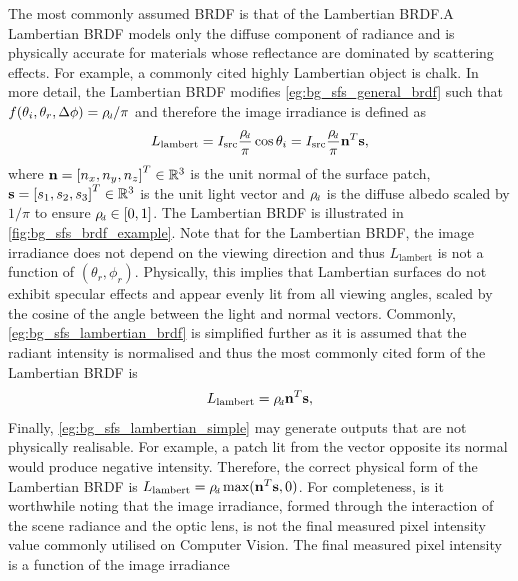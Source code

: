 The most commonly assumed BRDF is that of the Lambertian BRDF.\@ A Lambertian
BRDF models only the diffuse component of radiance and is physically accurate
for materials whose reflectance are dominated by scattering effects. For
example, a commonly cited highly Lambertian object is chalk. In more
detail, the Lambertian BRDF modifies \cref{eg:bg_sfs_general_brdf} such that
$f(\theta_i,\theta_r, \Delta \phi) = \rho_{\smallsub{d}} / \pi$ and therefore
the image irradiance is defined as
\begin{equation}\label{eg:bg_sfs_lambertian_brdf}
	L_{\operatorname{lambert}} = I_{\operatorname{src}} \frac{\rho_{\smallsub{d}}}{\pi} \cos{\theta_i} =
	I_{\operatorname{src}} \frac{\rho_{\smallsub{d}}}{\pi} \bb{n}^T \bb{s},
\end{equation}
where $\boldsymbol{\mathbf{n}} = {[n_x, n_y, n_z]}^T \in \mathbb{R}^{3}$ is the unit normal of the surface patch,
$\boldsymbol{\mathbf{s}} = {[s_1, s_2, s_3]}^T \in \mathbb{R}^{3}$ is the unit
light vector and $\rho_{\smallsub{d}}$ is the diffuse albedo scaled by $1/\pi$
to ensure $\rho_{\smallsub{d}} \in [0, 1]$. The Lambertian BRDF is illustrated
in \cref{fig:bg_sfs_brdf_example}. Note that for the Lambertian BRDF, the image
irradiance does not depend on the viewing direction and thus
$L_{\operatorname{lambert}}$ is not a function of $(\theta_r,\phi_r)$.
Physically, this implies that Lambertian surfaces do not exhibit specular
effects and appear evenly lit from all viewing angles, scaled by the cosine
of the angle between the light and normal vectors. Commonly,
\cref{eg:bg_sfs_lambertian_brdf} is simplified further as it is assumed that the
radiant intensity is normalised and thus the most commonly cited form of the
Lambertian BRDF is
\begin{equation}\label{eg:bg_sfs_lambertian_simple}
	L_{\operatorname{lambert}} = \rho_{\smallsub{d}} \bb{n}^T \bb{s},
\end{equation}
Finally, \cref{eg:bg_sfs_lambertian_simple} may generate outputs that are
not physically realisable. For example, a patch lit from the vector opposite
its normal would produce negative intensity. Therefore, the correct physical
form of the Lambertian BRDF is
$L_{\operatorname{lambert}} = \rho_{\smallsub{d}} \max(\bb{n}^T \bb{s}, 0)$.
For completeness, is it worthwhile noting that the image irradiance, formed
through the interaction of the scene radiance and the optic lens, is not
the final measured pixel intensity value commonly utilised on Computer Vision.
The final measured pixel intensity is a function of the image irradiance
